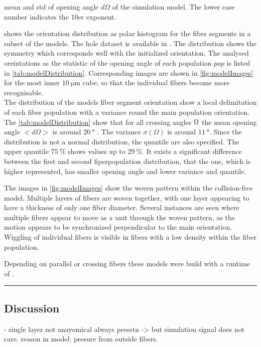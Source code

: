 % 
\begin{table}[!b]
\centering
\caption[Opening angle distribution]{mean and std of opening angle $d\Omega$ of the simulation model. The lower case number indicates the 10er exponent. }
\label{tab:modelDistribution}
\end{table}
% 
% 
% 
 shows the orientation distribution as polar histogram for the fiber segments in a subset of the models. 
The hole dataset is available in .
The distribution shows the symmetry which corresponds well with the initialized orientation.
The analysed oreintations as the statistic of the opening angle of each population $pop$ is listed in \cref{tab:modelDistribution}.
Corresponding images are shown in \cref{fig:modelImages} for the most inner $\SI{10}{\micro\meter}$ cube, so that the individual fibers become more recognisable.
\\
% 
The distribution of the models fiber segment orientation show a local delimitation of each fiber population with a variance round the main population orientation.
The \cref{tab:modelDistribution} show that for all crossing angles $\textnormal{$\Omega$}$ the mean opening angle $<d\Omega>$ is around $\SI{20}{\degree}$ .
The variance $\sigma(\Omega)$ is around $\SI{11}{\degree}$.
Since the distribution is not a normal distribution, the quantile are also specified.
The upper quantile $\SI{75}{\percent}$ shows values up to $\SI{29}{\percent}$.
It exists a significant difference between the first and second fiperpopulation distribution, that the one, which is higher represented, has smaller opening angle and lower variance and quantile.
\par
% 
The images in \cref{fig:modelImages} show the woven pattern within the collision-free model.
Multiple layers of fibers are woven together, with one layer appearing to have a thickness of only one fiber diameter.
Several instances are seen where multiple fibers appear to move as a unit through the woven pattern,\eg{} as the motion appears to be synchronized perpendicular to the main orientation.
Wiggling of individual fibers is visible in fibers with a low density within the fiber population.
\par
% 
Depending on parallel or crossing fibers these models were build with a runtime of \dummy{}.
% 
\par
\noindent\rule{\textwidth}{2pt}
\par
% 
\subsection{Discussion}
%
- single layer not anayomical always presetn -> but simulation signal does not care. reason in model: presure from outside fibers.
% 

